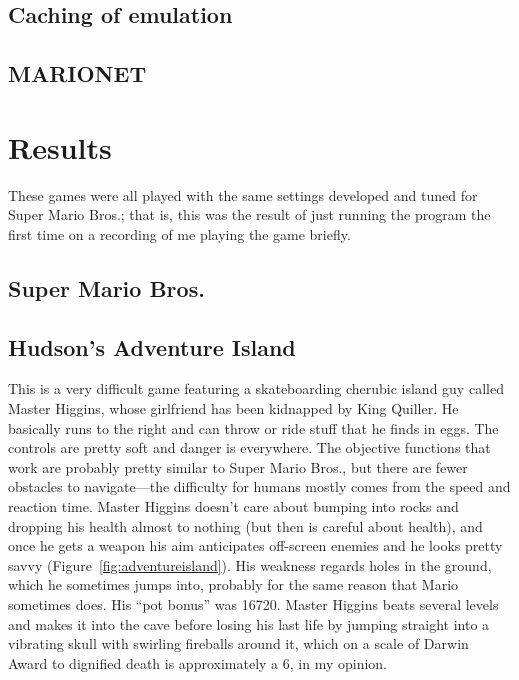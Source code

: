 \documentclass[twocolumn]{article}
\begin{document}
\subsection{Caching of emulation} \label{sec:caching}

\subsection{MARIONET}

\section{Results} \label{sec:results}

These games were all played with the same settings developed and tuned
for Super Mario Bros.; that is, this was the result of just running
the program the first time on a recording of me playing the game
briefly.

\subsection{Super Mario Bros.}



\subsection{Hudson's Adventure Island}

This is a very difficult game featuring a skateboarding cherubic
island guy called Master Higgins, whose girlfriend has been kidnapped
by King Quiller. He basically runs to the right and can throw or ride
stuff that he finds in eggs. The controls are pretty soft and danger
is everywhere. The objective functions that work are probably pretty
similar to Super Mario Bros., but there are fewer obstacles to
navigate---the difficulty for humans mostly comes from the speed and
reaction time. Master Higgins doesn't care about bumping into rocks
and dropping his health almost to nothing (but then is careful about
health), and once he gets a weapon his aim anticipates off-screen
enemies and he looks pretty savvy (Figure~\ref{fig:adventureisland}).
His weakness regards holes in the ground, which he sometimes jumps
into, probably for the same reason that Mario sometimes does. His
``pot bonus'' was 16720. Master Higgins beats several levels and makes
it into the cave before losing his last life by jumping straight into
a vibrating skull with swirling fireballs around it, which on a scale
of Darwin Award to dignified death is approximately a 6, in my
opinion.
\end{document}
